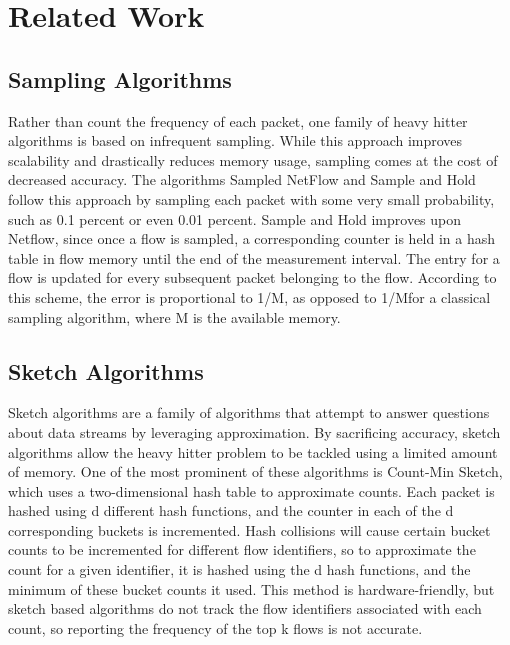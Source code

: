 \section{Related Work}
\label{sec:related}

\subsection{Sampling Algorithms}
Rather than count the frequency of each packet, one family of heavy hitter algorithms is based on infrequent sampling. While this approach improves scalability and drastically reduces memory usage, sampling comes at the cost of decreased accuracy. The algorithms Sampled NetFlow and Sample and Hold follow this approach by sampling each packet with some very small probability, such as 0.1 percent or even 0.01 percent. Sample and Hold improves upon Netflow, since once a flow is sampled, a corresponding counter is held in a hash table in flow memory until the end of the measurement interval. The entry for a flow is updated for every subsequent packet belonging to the flow. According to this scheme, the error is proportional to 1/M, as opposed to 1/Mfor a classical sampling algorithm, where M is the available memory. 

\subsection{Sketch Algorithms}
Sketch algorithms are a family of algorithms that attempt to answer questions about data streams by leveraging approximation. By sacrificing accuracy, sketch algorithms allow the heavy hitter problem to be tackled using a limited amount of memory. One of the most prominent of these algorithms is Count-Min Sketch, which uses a two-dimensional hash table to approximate counts. Each packet is hashed using d different hash functions, and the counter in each of the d corresponding buckets is incremented. Hash collisions will cause certain bucket counts to be incremented for different flow identifiers, so to approximate the count for a given identifier, it is hashed using the d hash functions, and the minimum of these bucket counts it used. This method is hardware-friendly, but sketch based algorithms do not track the flow identifiers associated with each count, so reporting the frequency of the top k flows is not accurate.

